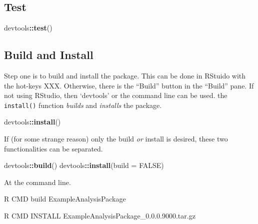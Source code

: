\documentclass[]{book}
\newenvironment{Shaded}{\begin{snugshade}}{\end{snugshade}}
\newcommand{\DataTypeTok}[1]{\textcolor[rgb]{0.13,0.29,0.53}{#1}}
\newcommand{\ExtensionTok}[1]{#1}
\newcommand{\KeywordTok}[1]{\textcolor[rgb]{0.13,0.29,0.53}{\textbf{#1}}}
\newcommand{\NormalTok}[1]{#1}
\newcommand{\OperatorTok}[1]{\textcolor[rgb]{0.81,0.36,0.00}{\textbf{#1}}}
\newcommand{\OtherTok}[1]{\textcolor[rgb]{0.56,0.35,0.01}{#1}}
\begin{document}
\hypertarget{test}{%
\subsection{Test}\label{test}}

\begin{Shaded}
\begin{Highlighting}[]
\NormalTok{devtools}\OperatorTok{::}\KeywordTok{test}\NormalTok{()}
\end{Highlighting}
\end{Shaded}

\hypertarget{build-and-install}{%
\subsection{Build and Install}\label{build-and-install}}

Step one is to build and install the package. This can be done in RStuido with the hot-keys XXX. Otherwise, there is the ``Build'' button in the ``Build'' pane. If not using RStudio, then `devtools' or the command line can be used. the \texttt{install()} function \emph{builds} and \emph{installs} the package.

\begin{Shaded}
\begin{Highlighting}[]
\NormalTok{devtools}\OperatorTok{::}\KeywordTok{install}\NormalTok{()}
\end{Highlighting}
\end{Shaded}

If (for some strange reason) only the build \emph{or} install is desired, these two functionalities can be separated.

\begin{Shaded}
\begin{Highlighting}[]
\NormalTok{devtools}\OperatorTok{::}\KeywordTok{build}\NormalTok{()}
\NormalTok{devtools}\OperatorTok{::}\KeywordTok{install}\NormalTok{(}\DataTypeTok{build =} \OtherTok{FALSE}\NormalTok{)}
\end{Highlighting}
\end{Shaded}

At the command line.

\begin{Shaded}
\begin{Highlighting}[]
\ExtensionTok{R}\NormalTok{ CMD build ExampleAnalysisPackage}



\ExtensionTok{R}\NormalTok{ CMD INSTALL ExampleAnalysisPackage_0.0.0.9000.tar.gz}


\end{Highlighting}
\end{Shaded}
\end{document}

